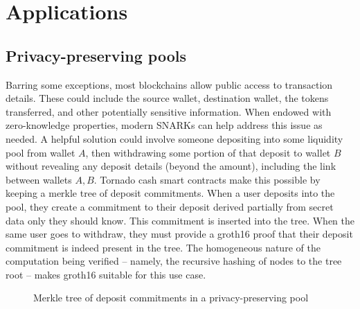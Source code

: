 \section{Applications}

\subsection{Privacy-preserving pools}
\noindent Barring some exceptions, most blockchains allow public access to transaction details. These could include the source wallet, destination wallet, the tokens transferred, and other potentially sensitive information. When endowed with zero-knowledge properties, modern SNARKs can help address this issue as needed. A helpful solution could involve someone depositing into some liquidity pool from wallet $A$, then withdrawing some portion of that deposit to wallet $B$ without revealing any deposit details (beyond the amount), including the link between wallets $A, B$. Tornado cash smart contracts make this possible by keeping a merkle tree of deposit commitments. When a user deposits into the pool, they create a commitment to their deposit derived partially from secret data only they should know. This commitment is inserted into the tree. When the same user goes to withdraw, they must provide a groth16 proof that their deposit commitment is indeed present in the tree. The homogeneous nature of the computation being verified -- namely, the recursive hashing of nodes to the tree root -- makes groth16 suitable for this use case.\\

\begin{figure}[ht]
\centering
{}
\caption{Merkle tree of deposit commitments in a privacy-preserving pool}
\label{fig:merkle-tree}
\end{figure}

